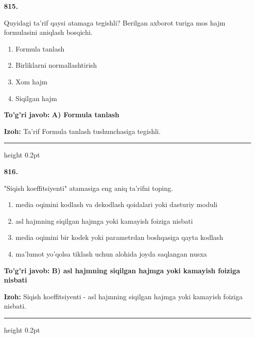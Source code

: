 \documentclass[10pt,a4paper,oneside]{article}
\begin{document}
\noindent\textbf{\color{ink}815.}
\par
Quyidagi ta'rif qaysi atamaga tegishli? Berilgan axborot turiga mos hajm formulasini aniqlash bosqichi.
\begin{enumerate}[label=\Alph*),leftmargin=9mm]
\item Formula tanlash
\item Birliklarni normallashtirish
\item Xom hajm
\item Siqilgan hajm
\end{enumerate}
\begin{tcolorbox}[enhanced,breakable,colback=teal!4,colframe=teal!50!black,boxrule=0.5pt,arc=1.1mm,left=3mm,right=3mm,top=1.7mm,bottom=1.7mm,before skip=2mm,after skip=2mm]
\textbf{\color{teal}To'g'ri javob:} \textbf{A) Formula tanlash}
\par\smallskip
\textbf{Izoh:} Ta'rif Formula tanlash tushunchasiga tegishli.
\end{tcolorbox}
\vspace{2mm}\hrule height 0.2pt \vspace{3mm}

\noindent\textbf{\color{ink}816.}
\par
"Siqish koeffitsiyenti" atamasiga eng aniq ta'rifni toping.
\begin{enumerate}[label=\Alph*),leftmargin=9mm]
\item media oqimini kodlash va dekodlash qoidalari yoki dasturiy moduli
\item asl hajmning siqilgan hajmga yoki kamayish foiziga nisbati
\item media oqimini bir kodek yoki parametrdan boshqasiga qayta kodlash
\item ma'lumot yo'qolsa tiklash uchun alohida joyda saqlangan nusxa
\end{enumerate}
\begin{tcolorbox}[enhanced,breakable,colback=teal!4,colframe=teal!50!black,boxrule=0.5pt,arc=1.1mm,left=3mm,right=3mm,top=1.7mm,bottom=1.7mm,before skip=2mm,after skip=2mm]
\textbf{\color{teal}To'g'ri javob:} \textbf{B) asl hajmning siqilgan hajmga yoki kamayish foiziga nisbati}
\par\smallskip
\textbf{Izoh:} Siqish koeffitsiyenti - asl hajmning siqilgan hajmga yoki kamayish foiziga nisbati.
\end{tcolorbox}
\vspace{2mm}\hrule height 0.2pt \vspace{3mm}
\end{document}
